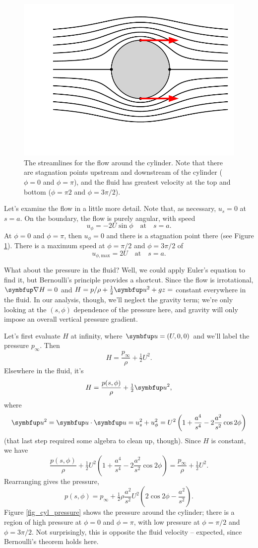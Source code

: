 \begin{figure}
\centering\includegraphics[width=0.7\linewidth]{Figures/Chapter3/fig_cylinder_stream}
\caption{The streamlines for the flow around the cylinder.  Note that there are stagnation points upstream and downstream of the cylinder ($\phi = 0$ and $\phi = \pi$), and the fluid has greatest velocity at the top and bottom ($\phi = \pi2$ and $\phi = 3\pi/2$).}
\label{fig_cyl_streamlines}
\end{figure}

Let's examine the flow in a little more detail.  Note that, as necessary, $u_s=0$ at $s=a$.  On the boundary, the flow is purely angular, with speed 
\[
u_\phi = -2U \sin \phi \quad \text{at} \quad s=a.
\]
At $\phi = 0$ and $\phi = \pi$, then $u_\phi = 0$ and there is a stagnation point there (see Figure \ref{fig_cyl_streamlines}).  There is a maximum speed at $\phi = \pi/2$ and $\phi = 3\pi/2$ of
\[
u_{\phi, \text{max}} = 2U \quad \text{at} \quad s=a.
\]

What about the pressure in the fluid?  Well, we could apply Euler's equation to find it, but Bernoulli's principle provides a shortcut.  Since the flow is irrotational, $\grad H = 0$ and $H = p/\rho + \tfrac{1}{2} \uu^2 + gz = $ constant everywhere in the fluid.  In our analysis, though, we'll neglect the gravity term; we're only looking at the $(s, \phi)$ dependence of the pressure here, and gravity will only impose an overall vertical pressure gradient.

Let's first evaluate $H$ at infinity, where $\uu = (U,0,0)$ and we'll label the pressure $p_\infty$.  Then
\[
H = \frac{p_\infty}{\rho} + \tfrac{1}{2} U^2.
\]
Elsewhere in the fluid, it's
\[
H = \frac{p(s, \phi)}{\rho} + \tfrac{1}{2} \uu^2,
\]
where
\[
\uu^2 = \uu \cdot \uu = u_s^2 + u_\phi^2 = U^2 \left( 1 + \frac{a^4}{s^4} - 2\frac{a^2}{s^2} \cos 2\phi \right)
\]
(that last step required some algebra to clean up, though).  Since $H$ is constant, we have
\[
\frac{p(s, \phi)}{\rho} + \tfrac{1}{2} U^2 \left( 1 + \frac{a^4}{s^4} - 2\frac{a^2}{s^2} \cos 2\phi \right) = \frac{p_\infty}{\rho} + \tfrac{1}{2} U^2.
\]
Rearranging gives the pressure,
\begin{equation}
p(s, \phi) = p_\infty + \tfrac{1}{2} \rho \frac{a^2}{s^2} U^2 \left( 2 \cos 2\phi - \frac{a^2}{s^2} \right).
\end{equation}
Figure \ref{fig_cyl_pressure} shows the pressure around the cylinder; there is a region of high pressure at $\phi = 0$ and $\phi = \pi$, with low pressure at $\phi = \pi/2$ and $\phi = 3\pi/2$.  Not surprisingly, this is opposite the fluid velocity -- expected, since Bernoulli's theorem holds here.

